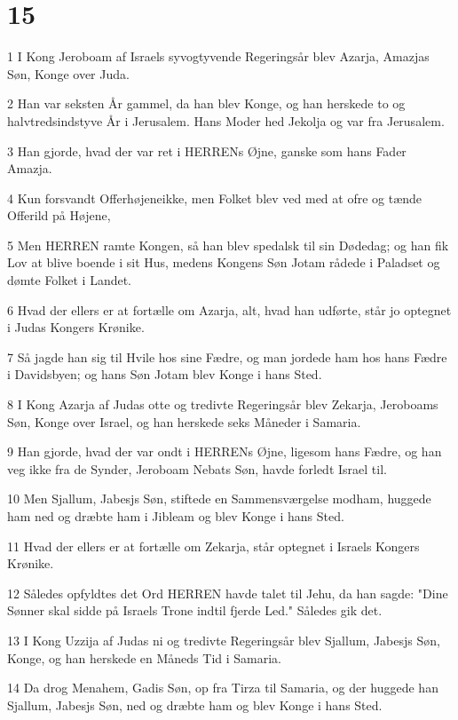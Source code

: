 \chapter{15}

\par 1 I Kong Jeroboam af Israels syvogtyvende Regeringsår blev Azarja, Amazjas Søn, Konge over Juda.
\par 2 Han var seksten År gammel, da han blev Konge, og han herskede to og halvtredsindstyve År i Jerusalem. Hans Moder hed Jekolja og var fra Jerusalem.
\par 3 Han gjorde, hvad der var ret i HERRENs Øjne, ganske som hans Fader Amazja.
\par 4 Kun forsvandt Offerhøjeneikke, men Folket blev ved med at ofre og tænde Offerild på Højene,
\par 5 Men HERREN ramte Kongen, så han blev spedalsk til sin Dødedag; og han fik Lov at blive boende i sit Hus, medens Kongens Søn Jotam rådede i Paladset og dømte Folket i Landet.
\par 6 Hvad der ellers er at fortælle om Azarja, alt, hvad han udførte, står jo optegnet i Judas Kongers Krønike.
\par 7 Så jagde han sig til Hvile hos sine Fædre, og man jordede ham hos hans Fædre i Davidsbyen; og hans Søn Jotam blev Konge i hans Sted.
\par 8 I Kong Azarja af Judas otte og tredivte Regeringsår blev Zekarja, Jeroboams Søn, Konge over Israel, og han herskede seks Måneder i Samaria.
\par 9 Han gjorde, hvad der var ondt i HERRENs Øjne, ligesom hans Fædre, og han veg ikke fra de Synder, Jeroboam Nebats Søn, havde forledt Israel til.
\par 10 Men Sjallum, Jabesjs Søn, stiftede en Sammensværgelse modham, huggede ham ned og dræbte ham i Jibleam og blev Konge i hans Sted.
\par 11 Hvad der ellers er at fortælle om Zekarja, står optegnet i Israels Kongers Krønike.
\par 12 Således opfyldtes det Ord HERREN havde talet til Jehu, da han sagde: "Dine Sønner skal sidde på Israels Trone indtil fjerde Led." Således gik det.
\par 13 I Kong Uzzija af Judas ni og tredivte Regeringsår blev Sjallum, Jabesjs Søn, Konge, og han herskede en Måneds Tid i Samaria.
\par 14 Da drog Menahem, Gadis Søn, op fra Tirza til Samaria, og der huggede han Sjallum, Jabesjs Søn, ned og dræbte ham og blev Konge i hans Sted.
